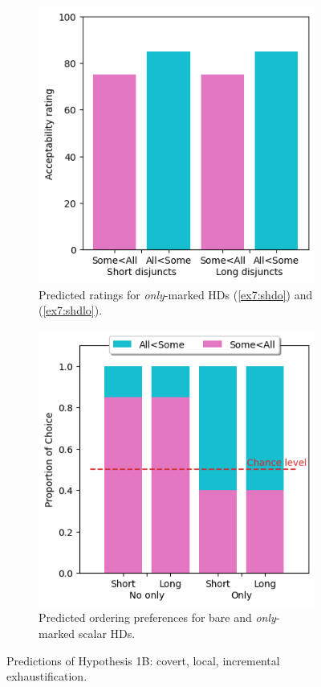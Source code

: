 \begin{figure}[H]
\begin{subfigure}[t]{.32\linewidth}
		\includegraphics[width=\linewidth]{./pred-1b-only.png}
		\caption[]{Predicted ratings for \textit{only}-marked HDs (\ref{ex7:shdo}) and (\ref{ex7:shdlo}).}
	\end{subfigure}
	\hfill
	\begin{subfigure}[t]{.32\linewidth}
		\centering
		\includegraphics[width=\linewidth]{./pred-1b-pref.png}
		\caption[]{Predicted ordering preferences for bare and \textit{only}-marked scalar HDs.}
	\end{subfigure}
	\caption[]{Predictions of Hypothesis 1B: covert, local, incremental exhaustification.}\label{fig7:predictions-exh-incr}
\end{figure} 


